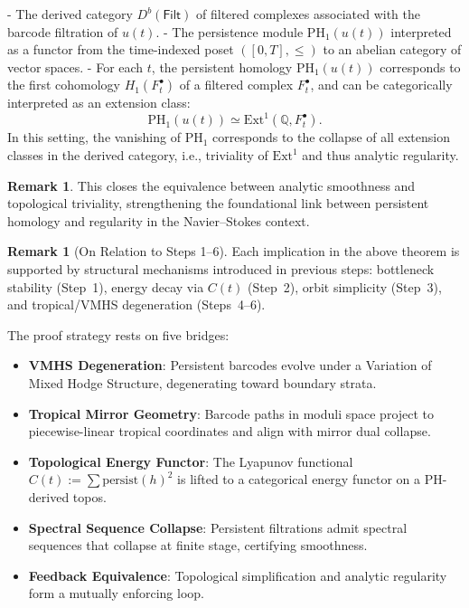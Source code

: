 \documentclass[11pt]{article}
\theoremstyle{definition}
\newtheorem{remark}[theorem]{Remark}
\begin{document}
- The derived category $D^b(\mathsf{Filt})$ of filtered complexes associated with the barcode filtration of $u(t)$.
- The persistence module $\mathrm{PH}_1(u(t))$ interpreted as a functor from the time-indexed poset $([0,T], \le)$ to an abelian category of vector spaces.
- For each $t$, the persistent homology $\mathrm{PH}_1(u(t))$ corresponds to the first cohomology $H_1(F^\bullet_t)$ of a filtered complex $F^\bullet_t$, and can be categorically interpreted as an extension class:
\[
\mathrm{PH}_1(u(t)) \simeq \mathrm{Ext}^1(\mathbb{Q}, F^\bullet_t).
\]
In this setting, the vanishing of $\mathrm{PH}_1$ corresponds to the collapse of all extension classes in the derived category, i.e., triviality of $\mathrm{Ext}^1$ and thus analytic regularity.


\begin{remark}
This closes the equivalence between analytic smoothness and topological triviality, strengthening the foundational link between persistent homology and regularity in the Navier--Stokes context.
\end{remark}

\begin{remark}[On Relation to Steps 1--6]
Each implication in the above theorem is supported by structural mechanisms introduced in previous steps: bottleneck stability (Step~1), energy decay via $C(t)$ (Step~2), orbit simplicity (Step~3), and tropical/VMHS degeneration (Steps~4--6).
\end{remark}

The proof strategy rests on five bridges:
\begin{itemize}
    \item \textbf{VMHS Degeneration}: Persistent barcodes evolve under a Variation of Mixed Hodge Structure, degenerating toward boundary strata.
    \item \textbf{Tropical Mirror Geometry}: Barcode paths in moduli space project to piecewise-linear tropical coordinates and align with mirror dual collapse.
    \item \textbf{Topological Energy Functor}: The Lyapunov functional $C(t) := \sum \text{persist}(h)^2$ is lifted to a categorical energy functor on a PH-derived topos.
    \item \textbf{Spectral Sequence Collapse}: Persistent filtrations admit spectral sequences that collapse at finite stage, certifying smoothness.
    \item \textbf{Feedback Equivalence}: Topological simplification and analytic regularity form a mutually enforcing loop.
\end{itemize}
\end{document}
